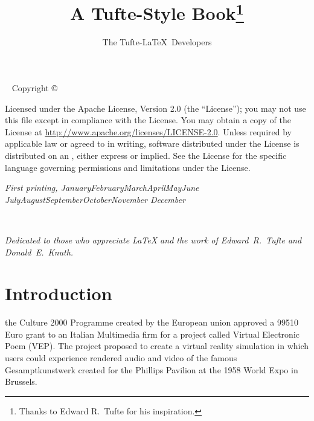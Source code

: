 \documentclass{tufte-book}
\title{A Tufte-Style Book\thanks{Thanks to Edward R.~Tufte for his inspiration.}}
\author[The Tufte-LaTeX Developers]{The Tufte-LaTeX\ Developers}
\newcommand{\monthyear}{%
  \ifcase\month\or January\or February\or March\or April\or May\or June\or
  July\or August\or September\or October\or November\or
  December\fi\space\number\year
}
\begin{document}
\frontmatter

\maketitle

\newpage
\begin{fullwidth}
~\vfill
\thispagestyle{empty}
\setlength{\parindent}{0pt}
\setlength{\parskip}{\baselineskip}
Copyright \copyright\ \the\year\ \thanklessauthor

\par{}

\par{}

\par Licensed under the Apache License, Version 2.0 (the ``License''); you may not
use this file except in compliance with the License. You may obtain a copy
of the License at \url{http://www.apache.org/licenses/LICENSE-2.0}. Unless
required by applicable law or agreed to in writing, software distributed
under the License is distributed on an , either express or implied. See the
License for the specific language governing permissions and limitations
under the License.

\par\textit{First printing, \monthyear}
\end{fullwidth}

\tableofcontents

\listoffigures

\listoftables

\cleardoublepage
~\vfill
\begin{doublespace}
\noindent\fontsize{18}{22}\selectfont\itshape
\nohyphenation
Dedicated to those who appreciate \LaTeX{} 
and the work of \mbox{Edward R.~Tufte} 
and \mbox{Donald E.~Knuth}.
\end{doublespace}
\vfill
\vfill


\cleardoublepage
\chapter*{Introduction}

 the Culture 2000 Programme created by the European union approved a 99510 Euro grant to an Italian Multimedia firm for a project called Virtual Electronic Poem (VEP)\cite{eu2004}. The project proposed to create a virtual reality simulation in which users could experience rendered audio and video of the famous Gesamptkunstwerk created for the Phillips Pavilion at the 1958 World Expo in Brussels. 
\end{document}
